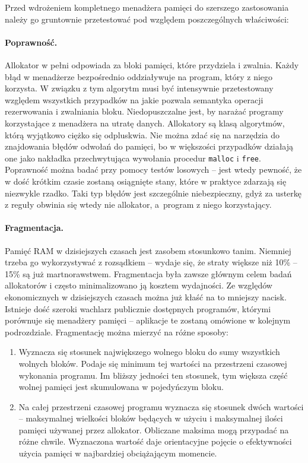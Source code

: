 \documentclass[12pt,a4paper,titlepage,twoside]{mwart}
\begin{document}
Przed wdrożeniem kompletnego menadżera pamięci do szerszego zastosowania należy
go gruntownie przetestować pod względem poszczególnych właściwości:

\paragraph{Poprawność.} Allokator w pełni odpowiada za bloki pamięci, które
przydziela i zwalnia. Każdy błąd w menadżerze bezpośrednio oddziaływuje na
program, który z niego korzysta. W związku z tym algorytm musi być intensywnie
przetestowany względem wszystkich przypadków na jakie pozwala semantyka
operacji rezerwowania i zwalniania bloku. Niedopuszczalne jest, by narażać
programy korzystające z menadżera na utratę danych. Allokatory są klasą
algorytmów, którą wyjątkowo ciężko się odpluskwia. Nie można zdać się na
narzędzia do znajdowania błędów odwołań do pamięci, bo w większości przypadków
działają one jako nakładka przechwytująca wywołania procedur \texttt{malloc} i
\texttt{free}. Poprawność można badać przy pomocy testów losowych -- jest wtedy
pewność, że w dość krótkim czasie zostaną osiągnięte stany, które w praktyce
zdarzają się niezwykle rzadko. Taki typ błędów jest szczególnie niebezpieczny,
gdyż za usterkę z reguły obwinia się wtedy nie allokator, a~program z niego
korzystający.

\paragraph{Fragmentacja.} Pamięć RAM w dzisiejszych czasach jest zasobem
stosunkowo tanim. Niemniej trzeba go wykorzystywać z rozsądkiem -- wydaje się,
że straty większe niż 10\% -- 15\% są już martnorawstwem. Fragmentacja była
zawsze głównym celem badań allokatorów i często minimalizowano ją kosztem
wydajności. Ze względów ekonomicznych w dzisiejszych czasach można już kłaść na
to mniejszy nacisk. Istnieje dość szeroki wachlarz publicznie dostępnych
programów, którymi porównuje się menadżery pamięci -- aplikacje te zostaną
omówione w kolejnym podrozdziale. Fragmentację można mierzyć na różne sposoby:

\begin{enumerate}

\item Wyznacza się stosunek największego wolnego bloku do sumy wszystkich
wolnych bloków. Podaje się minimum tej wartości na przestrzeni czasowej
wykonania programu. Im bliższy jedności ten stosunek, tym większa część wolnej
pamięci jest skumulowana w pojedyńczym bloku.

\vspace{1ex}

\item Na całej przestrzeni czasowej programu wyznacza się stosunek dwóch
wartości -- maksymalnej wielkości bloków będących w użyciu i maksymalnej ilości
pamięci używanej przez allokator. Obliczane maksima mogą przypadać na różne
chwile. Wyznaczona wartość daje orientacyjne pojęcie o efektywności użycia
pamięci w najbardziej obciążającym momencie.

\end{enumerate}
\end{document}
